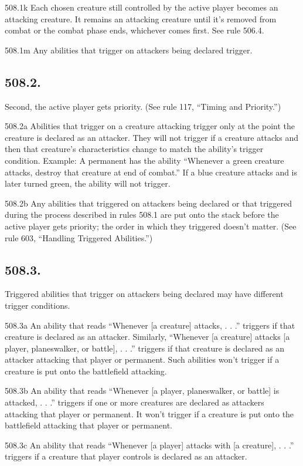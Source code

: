 508.1k Each chosen creature still controlled by the active player becomes an attacking creature. It remains an attacking creature until it’s removed from combat or the combat phase ends, whichever comes first. See rule 506.4.

508.1m Any abilities that trigger on attackers being declared trigger.

\subsection*{508.2.}
Second, the active player gets priority. (See rule 117, “Timing and Priority.”)

508.2a Abilities that trigger on a creature attacking trigger only at the point the creature is declared as an attacker. They will not trigger if a creature attacks and then that creature’s characteristics change to match the ability’s trigger condition.
Example: A permanent has the ability “Whenever a green creature attacks, destroy that creature at end of combat.” If a blue creature attacks and is later turned green, the ability will not trigger.

508.2b Any abilities that triggered on attackers being declared or that triggered during the process described in rules 508.1 are put onto the stack before the active player gets priority; the order in which they triggered doesn’t matter. (See rule 603, “Handling Triggered Abilities.”)

\subsection*{508.3.}
Triggered abilities that trigger on attackers being declared may have different trigger conditions.

508.3a An ability that reads “Whenever [a creature] attacks, . . .” triggers if that creature is declared as an attacker. Similarly, “Whenever [a creature] attacks [a player, planeswalker, or battle], . . .” triggers if that creature is declared as an attacker attacking that player or permanent. Such abilities won’t trigger if a creature is put onto the battlefield attacking.

508.3b An ability that reads “Whenever [a player, planeswalker, or battle] is attacked, . . .” triggers if one or more creatures are declared as attackers attacking that player or permanent. It won’t trigger if a creature is put onto the battlefield attacking that player or permanent.

508.3c An ability that reads “Whenever [a player] attacks with [a creature], . . .” triggers if a creature that player controls is declared as an attacker.

